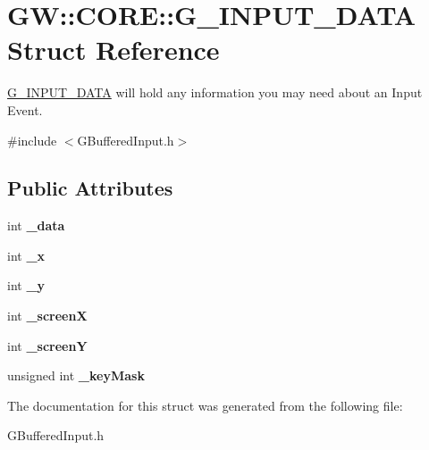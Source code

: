 \hypertarget{struct_g_w_1_1_c_o_r_e_1_1_g___i_n_p_u_t___d_a_t_a}{}\section{GW\+:\+:C\+O\+RE\+:\+:G\+\_\+\+I\+N\+P\+U\+T\+\_\+\+D\+A\+TA Struct Reference}
\label{struct_g_w_1_1_c_o_r_e_1_1_g___i_n_p_u_t___d_a_t_a}


\hyperlink{struct_g_w_1_1_c_o_r_e_1_1_g___i_n_p_u_t___d_a_t_a}{G\+\_\+\+I\+N\+P\+U\+T\+\_\+\+D\+A\+TA} will hold any information you may need about an Input Event.  




{\ttfamily \#include $<$G\+Buffered\+Input.\+h$>$}

\subsection*{Public Attributes}
\begin{DoxyCompactItemize}
\item 
\hypertarget{struct_g_w_1_1_c_o_r_e_1_1_g___i_n_p_u_t___d_a_t_a_a541bb159142d5b642362627a9b1647c4}{}\label{struct_g_w_1_1_c_o_r_e_1_1_g___i_n_p_u_t___d_a_t_a_a541bb159142d5b642362627a9b1647c4} 
int {\bfseries \+\_\+data}
\item 
\hypertarget{struct_g_w_1_1_c_o_r_e_1_1_g___i_n_p_u_t___d_a_t_a_a9fc513214eaa8c49a48a8e6b71ec7637}{}\label{struct_g_w_1_1_c_o_r_e_1_1_g___i_n_p_u_t___d_a_t_a_a9fc513214eaa8c49a48a8e6b71ec7637} 
int {\bfseries \+\_\+x}
\item 
\hypertarget{struct_g_w_1_1_c_o_r_e_1_1_g___i_n_p_u_t___d_a_t_a_a1bad4a3cffe34efefab4315f3816938a}{}\label{struct_g_w_1_1_c_o_r_e_1_1_g___i_n_p_u_t___d_a_t_a_a1bad4a3cffe34efefab4315f3816938a} 
int {\bfseries \+\_\+y}
\item 
\hypertarget{struct_g_w_1_1_c_o_r_e_1_1_g___i_n_p_u_t___d_a_t_a_a2ae44c595636a860b4a4944f5163db1f}{}\label{struct_g_w_1_1_c_o_r_e_1_1_g___i_n_p_u_t___d_a_t_a_a2ae44c595636a860b4a4944f5163db1f} 
int {\bfseries \+\_\+screenX}
\item 
\hypertarget{struct_g_w_1_1_c_o_r_e_1_1_g___i_n_p_u_t___d_a_t_a_aa8b98f86ea3359af1b6e4bcbb9c5db68}{}\label{struct_g_w_1_1_c_o_r_e_1_1_g___i_n_p_u_t___d_a_t_a_aa8b98f86ea3359af1b6e4bcbb9c5db68} 
int {\bfseries \+\_\+screenY}
\item 
\hypertarget{struct_g_w_1_1_c_o_r_e_1_1_g___i_n_p_u_t___d_a_t_a_afc9223ffbcf79f43b2ef6994a518f326}{}\label{struct_g_w_1_1_c_o_r_e_1_1_g___i_n_p_u_t___d_a_t_a_afc9223ffbcf79f43b2ef6994a518f326} 
unsigned int {\bfseries \+\_\+key\+Mask}
\end{DoxyCompactItemize}


The documentation for this struct was generated from the following file\+:\begin{DoxyCompactItemize}
\item 
G\+Buffered\+Input.\+h\end{DoxyCompactItemize}
